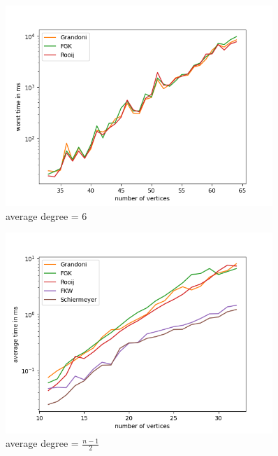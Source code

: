 \begin{figure}[H]
    \centering
    \includegraphics[width=0.9\textwidth]{figures/l6_worst.png}
    \caption{average degree = 6}
    \label{fig:l6_worst}
\end{figure}

\begin{figure}[H]
    \centering
    \includegraphics[width=0.9\textwidth]{figures/dense_average.png}
    \caption{average degree = $\frac{n-1}{2}$}
    \label{fig:dense_average}
\end{figure}

